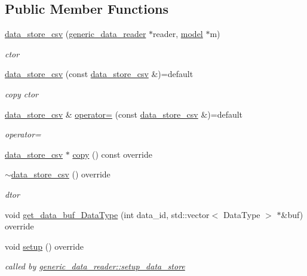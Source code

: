 \subsection*{Public Member Functions}
\begin{DoxyCompactItemize}
\item 
\hyperlink{classlbann_1_1data__store__csv_add3e9e9c37f1cdf0e3dba00cc6f49507}{data\+\_\+store\+\_\+csv} (\hyperlink{classlbann_1_1generic__data__reader}{generic\+\_\+data\+\_\+reader} $\ast$reader, \hyperlink{classlbann_1_1model}{model} $\ast$m)
\begin{DoxyCompactList}\small\item\em ctor \end{DoxyCompactList}\item 
\hyperlink{classlbann_1_1data__store__csv_af6bdd542f3e87528c3f2ee2b6f9fdff8}{data\+\_\+store\+\_\+csv} (const \hyperlink{classlbann_1_1data__store__csv}{data\+\_\+store\+\_\+csv} \&)=default
\begin{DoxyCompactList}\small\item\em copy ctor \end{DoxyCompactList}\item 
\hyperlink{classlbann_1_1data__store__csv}{data\+\_\+store\+\_\+csv} \& \hyperlink{classlbann_1_1data__store__csv_a9a8cadac9ca32ad0da758bfdd2112755}{operator=} (const \hyperlink{classlbann_1_1data__store__csv}{data\+\_\+store\+\_\+csv} \&)=default
\begin{DoxyCompactList}\small\item\em operator= \end{DoxyCompactList}\item 
\hyperlink{classlbann_1_1data__store__csv}{data\+\_\+store\+\_\+csv} $\ast$ \hyperlink{classlbann_1_1data__store__csv_a2e95f53f539a838e6c6484b9f4de5a45}{copy} () const override
\item 
\hyperlink{classlbann_1_1data__store__csv_a6e0928f649f9a808c4e73b77f34ffae3}{$\sim$data\+\_\+store\+\_\+csv} () override
\begin{DoxyCompactList}\small\item\em dtor \end{DoxyCompactList}\item 
void \hyperlink{classlbann_1_1data__store__csv_a3125cf637d40e8908c68bb74690f06da}{get\+\_\+data\+\_\+buf\+\_\+\+Data\+Type} (int data\+\_\+id, std\+::vector$<$ Data\+Type $>$ $\ast$\&buf) override
\item 
void \hyperlink{classlbann_1_1data__store__csv_a184c7e6f27c5e07255b9c889ace02407}{setup} () override
\begin{DoxyCompactList}\small\item\em called by \hyperlink{classlbann_1_1generic__data__reader_a8b2a09d38512fc11f1b9d572c89100a7}{generic\+\_\+data\+\_\+reader\+::setup\+\_\+data\+\_\+store} \end{DoxyCompactList}\end{DoxyCompactItemize}
